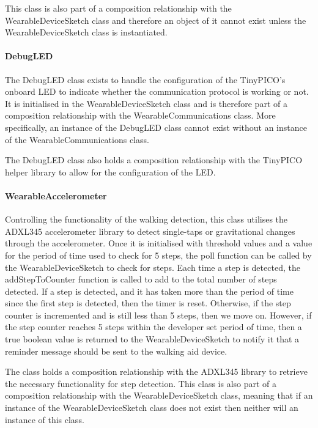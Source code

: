                     This class is also part of a composition relationship with the WearableDeviceSketch class and therefore an object of it cannot exist unless the WearableDeviceSketch class is instantiated.

                \paragraph{DebugLED}\mbox{}

                    The DebugLED class exists to handle the configuration of the TinyPICO's onboard LED to indicate whether the communication protocol is working or not. It is initialised in the WearableDeviceSketch class and is therefore part of a composition relationship with the WearableCommunications class. More specifically, an instance of the DebugLED class cannot exist without an instance of the WearableCommunications class.

                    The DebugLED class also holds a composition relationship with the TinyPICO helper library to allow for the configuration of the LED.

                \paragraph{WearableAccelerometer}\mbox{}

                    Controlling the functionality of the walking detection, this class utilises the ADXL345 accelerometer library to detect single-taps or gravitational changes through the accelerometer. Once it is initialised with threshold values and a value for the period of time used to check for 5 steps, the poll function can be called by the WearableDeviceSketch to check for steps. Each time a step is detected, the addStepToCounter function is called to add to the total number of steps detected. If a step is detected, and it has taken more than the period of time since the first step is detected, then the timer is reset. Otherwise, if the step counter is incremented and is still less than 5 steps, then we move on. However, if the step counter reaches 5 steps within the developer set period of time, then a true boolean value is returned to the WearableDeviceSketch to notify it that a reminder message should be sent to the walking aid device.

                    The class holds a composition relationship with the ADXL345 library to retrieve the necessary functionality for step detection. This class is also part of a composition relationship with the WearableDeviceSketch class, meaning that if an instance of the WearableDeviceSketch class does not exist then neither will an instance of this class. 

